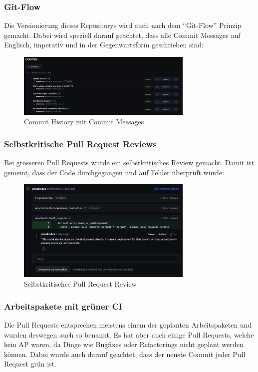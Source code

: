 \subsubsection{Git-Flow}
Die Versionierung dieses Repositorys wird auch nach dem \enquote{Git-Flow} Prinzip gemacht. Dabei wird
speziell darauf geachtet, dass alle Commit Messages auf Englisch, imperativ und in der Gegenwartsform
geschrieben sind: 
\begin{figure}[H]
    \centering    
    \includegraphics[width=0.75\textwidth]{images/misc/git_commit_message.png}
    \caption[Ein Screenshot der Commit History mit den Commit Messages]{Commit History mit Commit Messages}
    \label{fig:git_commit_message}
\end{figure}

\newpage
\subsubsection{Selbstkritische Pull Request Reviews}
Bei grösseren Pull Requests wurde ein selbstkritisches Review gemacht. Damit ist gemeint, dass der Code durchgegangen
und auf Fehler überprüft wurde:
\begin{figure}[H]
    \centering
    \includegraphics[width=0.75\textwidth]{images/misc/git_pr_review.png}
    \caption[Ein Screenshot eines selbstkritischen Pull Request Reviews]{Selbstkritisches Pull Request Review}
    \label{fig:git_pr_review}
\end{figure}
\subsubsection{Arbeitspakete mit \gls{grün}er CI}
Die Pull Requests entsprechen meistens einem der geplanten Arbeitspaketen und wurden deswegen auch so benannt. Es hat
aber auch einige Pull Requests, welche kein AP waren, da Dinge wie Bugfixes oder Refactorings nicht geplant
werden können. \newline
Dabei wurde auch darauf geachtet, dass der neuste Commit jeder Pull Request grün ist.

